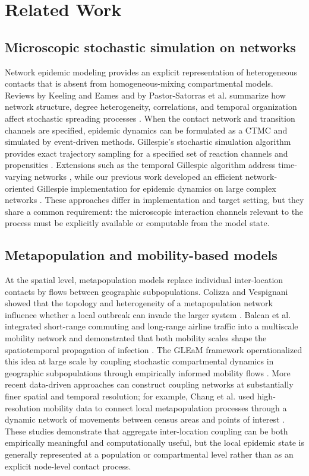 \documentclass[a4paper,fleqn]{cas-sc}
\begin{document}
\section{Related Work}
\label{sec:related_work}

\subsection{Microscopic stochastic simulation on networks}

Network epidemic modeling provides an explicit representation of heterogeneous contacts that is absent from homogeneous-mixing compartmental models. Reviews by Keeling and Eames and by Pastor-Satorras et al. summarize how network structure, degree heterogeneity, correlations, and temporal organization affect stochastic spreading processes \cite{keeling2005,pastorsatorras2015}. When the contact network and transition channels are specified, epidemic dynamics can be formulated as a CTMC and simulated by event-driven methods. Gillespie's stochastic simulation algorithm provides exact trajectory sampling for a specified set of reaction channels and propensities \cite{gillespie1977exact}. Extensions such as the temporal Gillespie algorithm address time-varying networks \cite{vestergaard2015}, while our previous work developed an efficient network-oriented Gillespie implementation for epidemic dynamics on large complex networks \cite{kuryliak2025simulating}. These approaches differ in implementation and target setting, but they share a common requirement: the microscopic interaction channels relevant to the process must be explicitly available or computable from the model state.

\subsection{Metapopulation and mobility-based models}

At the spatial level, metapopulation models replace individual inter-location contacts by flows between geographic subpopulations. Colizza and Vespignani showed that the topology and heterogeneity of a metapopulation network influence whether a local outbreak can invade the larger system \cite{colizza2007reaction}. Balcan et al. integrated short-range commuting and long-range airline traffic into a multiscale mobility network and demonstrated that both mobility scales shape the spatiotemporal propagation of infection \cite{balcan2009}. The GLEaM framework operationalized this idea at large scale by coupling stochastic compartmental dynamics in geographic subpopulations through empirically informed mobility flows \cite{balcan2010modeling}. More recent data-driven approaches can construct coupling networks at substantially finer spatial and temporal resolution; for example, Chang et al. used high-resolution mobility data to connect local metapopulation processes through a dynamic network of movements between census areas and points of interest \cite{chang2021}. These studies demonstrate that aggregate inter-location coupling can be both empirically meaningful and computationally useful, but the local epidemic state is generally represented at a population or compartmental level rather than as an explicit node-level contact process.
\end{document}
